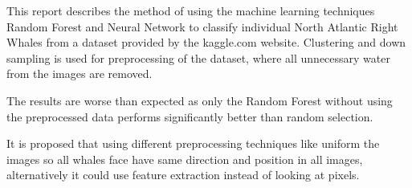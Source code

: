This report describes the method of using the machine learning techniques Random Forest and Neural Network to classify individual North Atlantic Right Whales from a dataset provided by the kaggle.com website. Clustering and down sampling is used for preprocessing of the dataset, where all unnecessary water from the images are removed.

The results are worse than expected as only the Random Forest without using the preprocessed data performs significantly better than random selection. 

It is proposed that using different preprocessing techniques like uniform the images so all whales face have same direction and position in all images, alternatively it could use feature extraction instead of looking at pixels.